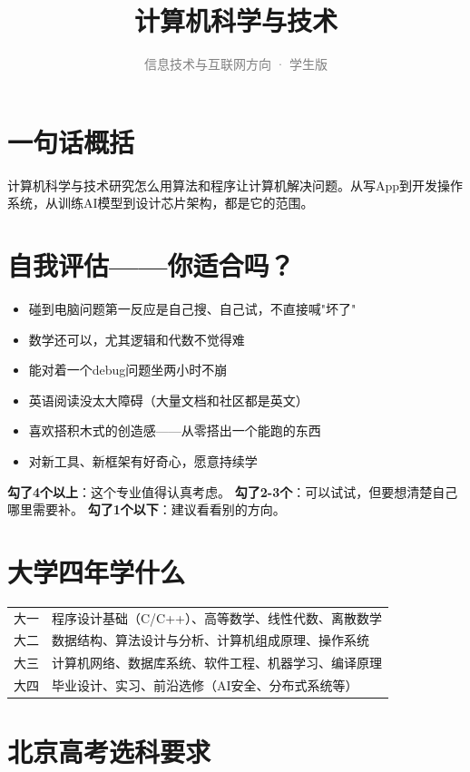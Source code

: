 \documentclass[a4paper,12pt]{ctexart}
\title{\textcolor{blue!70!black}{\Huge\textbf{计算机科学与技术}}}
\subtitle{\textcolor{gray}{信息技术与互联网方向 · 学生版}}
\author{}
\date{}
\begin{document}
\maketitle
\thispagestyle{empty}

\section{一句话概括}

计算机科学与技术研究怎么用算法和程序让计算机解决问题。从写App到开发操作系统，从训练AI模型到设计芯片架构，都是它的范围。

\section{自我评估——你适合吗？}

\begin{itemize}
  \item[\textbf{☐}] 碰到电脑问题第一反应是自己搜、自己试，不直接喊"坏了"
  \item[\textbf{☐}] 数学还可以，尤其逻辑和代数不觉得难
  \item[\textbf{☐}] 能对着一个debug问题坐两小时不崩
  \item[\textbf{☐}] 英语阅读没太大障碍（大量文档和社区都是英文）
  \item[\textbf{☐}] 喜欢搭积木式的创造感——从零搭出一个能跑的东西
  \item[\textbf{☐}] 对新工具、新框架有好奇心，愿意持续学
\end{itemize}

\textbf{勾了4个以上}：这个专业值得认真考虑。
\textbf{勾了2-3个}：可以试试，但要想清楚自己哪里需要补。
\textbf{勾了1个以下}：建议看看别的方向。

\section{大学四年学什么}

\begin{tabular}{ll}
\toprule
大一 & 程序设计基础（C/C++）、高等数学、线性代数、离散数学 \\
大二 & 数据结构、算法设计与分析、计算机组成原理、操作系统 \\
大三 & 计算机网络、数据库系统、软件工程、机器学习、编译原理 \\
大四 & 毕业设计、实习、前沿选修（AI安全、分布式系统等） \\
\bottomrule
\end{tabular}

\section{北京高考选科要求}
\end{document}
